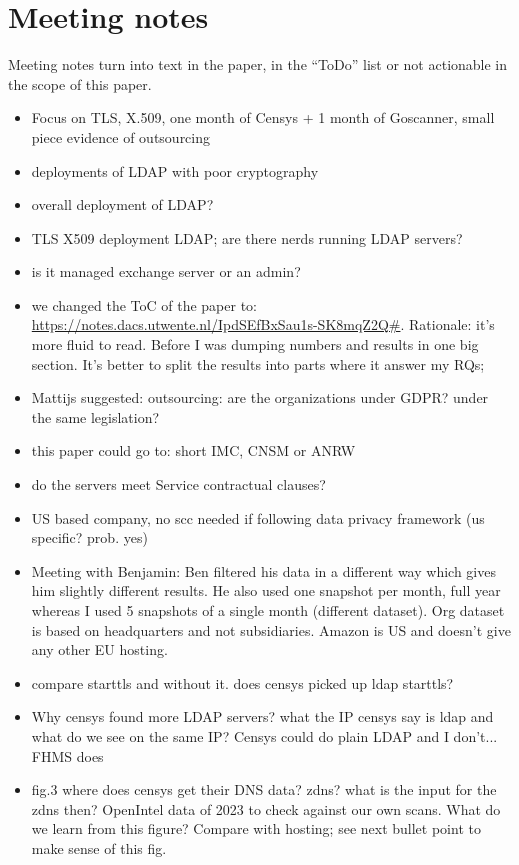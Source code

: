 \section*{Meeting notes}
Meeting notes turn into text in the paper, in the ``ToDo'' list or not actionable in the scope of this paper.
\begin{itemize}
    \item Focus on TLS, X.509, one month of Censys + 1 month of Goscanner, small piece evidence of outsourcing
    \item deployments of LDAP with poor cryptography
    \item overall deployment of LDAP?
    \item TLS X509 deployment LDAP; are there nerds running LDAP servers?
    \item is it managed exchange server or an admin?
    \item we changed the ToC of the paper to: \url{https://notes.dacs.utwente.nl/IpdSEfBxSau1s-SK8mqZ2Q#}. Rationale: it's more fluid to read. Before I was dumping numbers and results in one big section. It's better to split the results into parts where it answer my RQs;
    \item Mattijs suggested: outsourcing: are the organizations under GDPR? under the same legislation?
    \item this paper could go to: short IMC, CNSM or ANRW
    \item do the servers meet Service contractual clauses?
    \item US based company, no scc needed if following data privacy framework (us specific? prob. yes)
    \item Meeting with Benjamin: Ben filtered his data in a different way which gives him slightly different results. He also used one snapshot per month, full year whereas I used 5 snapshots of a single month (different dataset). Org dataset is based on headquarters and not subsidiaries. Amazon is US and doesn't give any other EU hosting.
    \item compare starttls and without it. does censys picked up ldap starttls?
    \item Why censys found more LDAP servers? what the IP censys say is ldap and what do we see on the same IP? Censys could do plain LDAP and I don't... FHMS does
    \item fig.3 where does censys get their DNS data? zdns? what is the input for the zdns then? OpenIntel data of 2023 to check against our own scans. What do we learn from this figure? Compare with hosting; see next bullet point to make sense of this fig.

\end{itemize}
